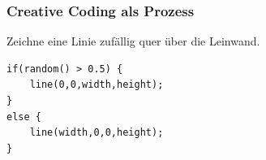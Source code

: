 \documentclass[aspectratio=169]{beamer}
\begin{document}
\begin{frame}[fragile]
\frametitle{Creative Coding als Prozess}
Zeichne eine Linie zufällig quer über die Leinwand.

{\color{p5darkbasicstyle}
\begin{lstlisting}
if(random() > 0.5) {
	line(0,0,width,height);
}
else {
	line(width,0,0,height);
}
\end{lstlisting}
}

  \begin{center}
  	\hspace{1cm}
  \end{center}
\end{frame}
\end{document}
